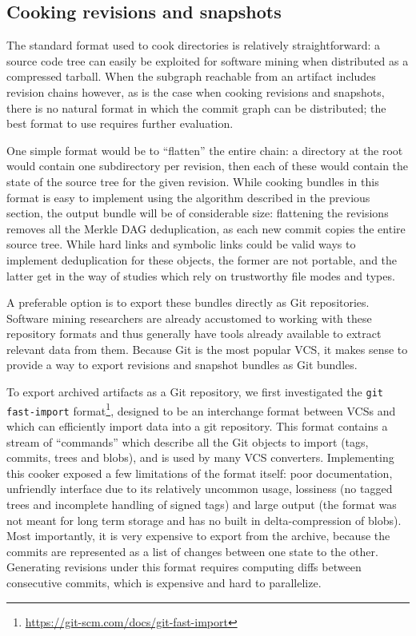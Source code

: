 \subsection{Cooking revisions and snapshots}

The standard format used to cook directories is relatively straightforward: a
source code tree can easily be exploited for software mining when distributed
as a compressed tarball. When the subgraph reachable from an artifact includes
revision chains however, as is the case when cooking revisions and snapshots,
there is no natural format in which the commit graph can be distributed; the
best format to use requires further evaluation.

One simple format would be to ``flatten'' the entire chain: a directory at the
root would contain one subdirectory per revision, then each of these would
contain the state of the source tree for the given revision. While cooking
bundles in this format is easy to implement using the algorithm described in
the previous section, the output bundle will be of considerable size:
flattening the revisions removes all the Merkle DAG deduplication, as each new
commit copies the entire source tree. While hard links and symbolic
links could be valid ways to implement deduplication for these objects, the
former are not portable, and the latter get in the way of studies which rely on
trustworthy file modes and types.

A preferable option is to export these bundles directly as Git repositories.
Software mining researchers are already accustomed to working with these
repository formats and thus generally have tools already available to extract
relevant data from them. Because Git is the most popular \gls{VCS}, it makes
sense to provide a way to export revisions and snapshot bundles as Git bundles.

To export archived artifacts as a Git repository, we first investigated the
\texttt{git fast-import}
format\footnote{\url{https://git-scm.com/docs/git-fast-import}}, designed to be
an interchange format between \glspl{VCS} and which can efficiently import data
into a git repository. This format contains a stream of ``commands'' which
describe all the Git objects to import (tags, commits, trees and blobs), and is
used by many \gls{VCS} converters. Implementing this cooker exposed a few
limitations of the format itself: poor documentation, unfriendly interface due
to its relatively uncommon usage, lossiness (no tagged trees and incomplete
handling of signed tags) and large output (the format was not meant for long
term storage and has no built in delta-compression of blobs).  Most
importantly, it is very expensive to export from the archive, because the
commits are represented as a list of changes between one state to the other.
Generating revisions under this format requires computing diffs between
consecutive commits, which is expensive and hard to parallelize.

